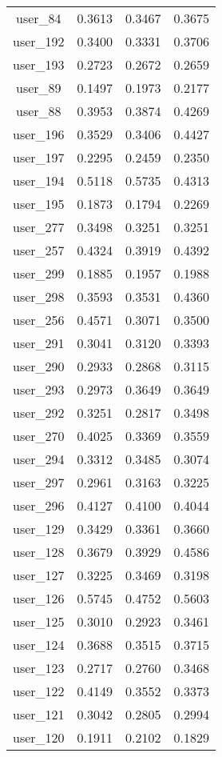 \begin{table}[ht]
\begin{tabular}{|c|c|c|c|}
user_84  &  0.3613   &  0.3467   &  0.3675 \\ 
user_192  &  0.3400   &  0.3331   &  0.3706 \\ 
user_193  &  0.2723   &  0.2672   &  0.2659 \\ 
user_89  &  0.1497   &  0.1973   &  0.2177 \\ 
user_88  &  0.3953   &  0.3874   &  0.4269 \\ 
user_196  &  0.3529   &  0.3406   &  0.4427 \\ 
user_197  &  0.2295   &  0.2459   &  0.2350 \\ 
user_194  &  0.5118   &  0.5735   &  0.4313 \\ 
user_195  &  0.1873   &  0.1794   &  0.2269 \\ 
user_277  &  0.3498   &  0.3251   &  0.3251 \\ 
user_257  &  0.4324   &  0.3919   &  0.4392 \\ 
user_299  &  0.1885   &  0.1957   &  0.1988 \\ 
user_298  &  0.3593   &  0.3531   &  0.4360 \\ 
user_256  &  0.4571   &  0.3071   &  0.3500 \\ 
user_291  &  0.3041   &  0.3120   &  0.3393 \\ 
user_290  &  0.2933   &  0.2868   &  0.3115 \\ 
user_293  &  0.2973   &  0.3649   &  0.3649 \\ 
user_292  &  0.3251   &  0.2817   &  0.3498 \\ 
user_270  &  0.4025   &  0.3369   &  0.3559 \\ 
user_294  &  0.3312   &  0.3485   &  0.3074 \\ 
user_297  &  0.2961   &  0.3163   &  0.3225 \\ 
user_296  &  0.4127   &  0.4100   &  0.4044 \\ 
user_129  &  0.3429   &  0.3361   &  0.3660 \\ 
user_128  &  0.3679   &  0.3929   &  0.4586 \\ 
user_127  &  0.3225   &  0.3469   &  0.3198 \\ 
user_126  &  0.5745   &  0.4752   &  0.5603 \\ 
user_125  &  0.3010   &  0.2923   &  0.3461 \\ 
user_124  &  0.3688   &  0.3515   &  0.3715 \\ 
user_123  &  0.2717   &  0.2760   &  0.3468 \\ 
user_122  &  0.4149   &  0.3552   &  0.3373 \\ 
user_121  &  0.3042   &  0.2805   &  0.2994 \\ 
user_120  &  0.1911   &  0.2102   &  0.1829 \\ 
\hline
 \end{tabular}
  \end{table}



